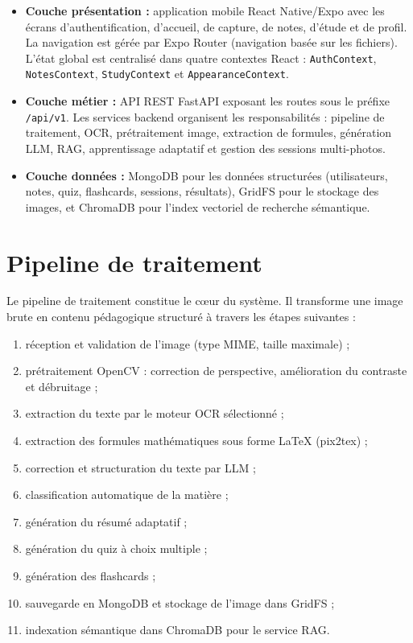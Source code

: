 \documentclass[12pt,a4paper]{report}
\begin{document}
\begin{itemize}[label=--]
    \item \textbf{Couche présentation :} application mobile React Native/Expo avec les écrans d'authentification, d'accueil, de capture, de notes, d'étude et de profil. La navigation est gérée par Expo Router (navigation basée sur les fichiers). L'état global est centralisé dans quatre contextes React : \texttt{AuthContext}, \texttt{NotesContext}, \texttt{StudyContext} et \texttt{AppearanceContext}.

    \item \textbf{Couche métier :} API REST FastAPI exposant les routes sous le préfixe \texttt{/api/v1}. Les services backend organisent les responsabilités : pipeline de traitement, OCR, prétraitement image, extraction de formules, génération LLM, RAG, apprentissage adaptatif et gestion des sessions multi-photos.

    \item \textbf{Couche données :} MongoDB pour les données structurées (utilisateurs, notes, quiz, flashcards, sessions, résultats), GridFS pour le stockage des images, et ChromaDB pour l'index vectoriel de recherche sémantique.
\end{itemize}

\section{Pipeline de traitement}

Le pipeline de traitement constitue le cœur du système. Il transforme une image brute en contenu pédagogique structuré à travers les étapes suivantes :

\begin{enumerate}
    \item réception et validation de l'image (type MIME, taille maximale) ;
    \item prétraitement OpenCV : correction de perspective, amélioration du contraste et débruitage ;
    \item extraction du texte par le moteur OCR sélectionné ;
    \item extraction des formules mathématiques sous forme LaTeX (pix2tex) ;
    \item correction et structuration du texte par LLM ;
    \item classification automatique de la matière ;
    \item génération du résumé adaptatif ;
    \item génération du quiz à choix multiple ;
    \item génération des flashcards ;
    \item sauvegarde en MongoDB et stockage de l'image dans GridFS ;
    \item indexation sémantique dans ChromaDB pour le service RAG.
\end{enumerate}
\end{document}
